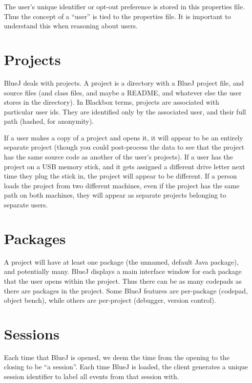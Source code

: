 \documentclass{report}
\begin{document}
The user's unique identifier or opt-out preference is stored in this
properties file.  Thus the concept of a ``user'' is tied to the properties
file.  It is important to understand this when reasoning about users.

\section{Projects}
\label{def:projects}

BlueJ deals with projects.  A project is a directory with a BlueJ project
file, and source files (and class files, and maybe a README, and whatever else
the user stores in the directory).  In Blackbox terms, projects are associated
with particular user ids.  They are identified only by the associated user,
and their full path (hashed, for anonymity).

If a user makes a copy of a project and opens it, it will appear to be an
entirely separate project (though you could post-process the data to see that
the project has the same source code as another of the user's projects).  If a
user has the project on a USB memory stick, and it gets assigned a different
drive letter next time they plug the stick in, the project will appear to be
different.  If a person loads the project from two different machines, even if
the project has the same path on both machines, they will appear as separate
projects belonging to separate users.

\section{Packages}
\label{def:packages}

A project will have at least one package (the unnamed, default Java package),
and potentially many.  BlueJ displays a main interface window for each package
that the user opens within the project.  Thus there can be as many codepads as
there are packages in the project.  Some BlueJ features are per-package (codepad,
object bench), while others are per-project (debugger, version control).

\section{Sessions}
\label{def:sequence_id}

Each time that BlueJ is opened, we deem the time from the opening to the
closing to be ``a session''.  Each time BlueJ is loaded, the client generates
a unique session identifier to label all events from that session with.
\end{document}
